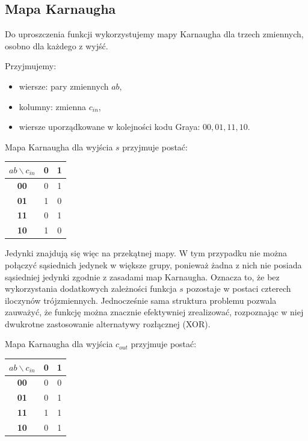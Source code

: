 \subsection{Mapa Karnaugha}

Do uproszczenia funkcji wykorzystujemy mapy Karnaugha dla trzech zmiennych, osobno dla każdego z wyjść.

Przyjmujemy:
\begin{itemize}
    \item wiersze: pary zmiennych $ab$,
    \item kolumny: zmienna $c_{in}$,
    \item wiersze uporządkowane w kolejności kodu Graya: $00, 01, 11, 10$.
\end{itemize}

Mapa Karnaugha dla wyjścia $s$ przyjmuje postać:

\begin{center}
\begin{tabular}{|c|c|c|}
\hline
$ab \backslash c_{in}$ & \textbf{0} & \textbf{1} \\
\hline
\textbf{00} & 0 & 1 \\
\hline
\textbf{01} & 1 & 0 \\
\hline
\textbf{11} & 0 & 1 \\
\hline
\textbf{10} & 1 & 0 \\
\hline
\end{tabular}
\end{center}

Jedynki znajdują się więc na przekątnej mapy. W tym przypadku nie można połączyć sąsiednich jedynek w większe grupy, ponieważ żadna z nich nie posiada sąsiedniej jedynki zgodnie z zasadami map Karnaugha. Oznacza to, że bez wykorzystania dodatkowych zależności funkcja $s$ pozostaje w postaci czterech iloczynów trójzmiennych. Jednocześnie sama struktura problemu pozwala zauważyć, że funkcję można znacznie efektywniej zrealizować, rozpoznając w niej dwukrotne zastosowanie alternatywy rozłącznej (XOR).

Mapa Karnaugha dla wyjścia $c_{out}$ przyjmuje postać:

\begin{center}
\begin{tabular}{|c|c|c|}
\hline
$ab \backslash c_{in}$ & \textbf{0} & \textbf{1} \\
\hline
\textbf{00} & 0 & 0 \\
\hline
\textbf{01} & 0 & 1 \\
\hline
\textbf{11} & 1 & 1 \\
\hline
\textbf{10} & 0 & 1 \\
\hline
\end{tabular}
\end{center}

